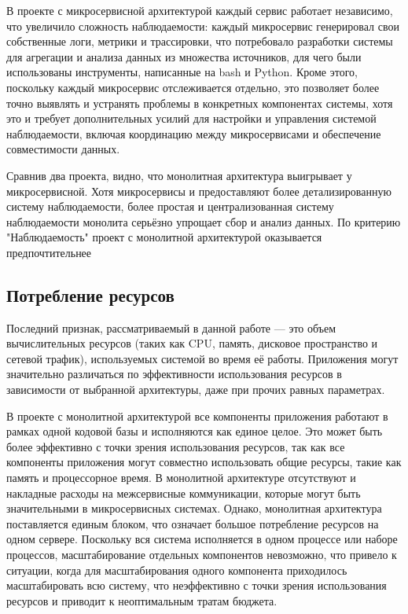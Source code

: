    В проекте с микросервисной архитектурой каждый сервис работает независимо, что увеличило сложность наблюдаемости: каждый микросервис генерировал свои собственные логи, метрики и трассировки, что потребовало разработки системы для агрегации и анализа данных из множества источников, для чего были использованы инструменты, написанные на bash и Python. Кроме этого, поскольку каждый микросервис отслеживается отдельно, это позволяет более точно выявлять и устранять проблемы в конкретных компонентах системы, хотя это и требует дополнительных усилий для настройки и управления системой наблюдаемости, включая координацию между микросервисами и обеспечение совместимости данных.
    
    Сравнив два проекта, видно, что монолитная архитектура выигрывает у микросервисной. Хотя микросервисы и предоставляют более детализированную систему наблюдаемости, более простая и централизованная систему наблюдаемости монолита серьёзно упрощает сбор и анализ данных. По критерию "Наблюдаемость" проект с монолитной архитектурой оказывается предпочтительнее

\subsection{Потребление ресурсов}
    Последний признак, рассматриваемый в данной работе — это объем вычислительных ресурсов (таких как CPU, память, дисковое пространство и сетевой трафик), используемых системой во время её работы. Приложения могут значительно различаться по эффективности использования ресурсов в зависимости от выбранной архитектуры, даже при прочих равных параметрах.
    
    В проекте с монолитной архитектурой все компоненты приложения работают в рамках одной кодовой базы и исполняются как единое целое. Это может быть более эффективно с точки зрения использования ресурсов, так как все компоненты приложения могут совместно использовать общие ресурсы, такие как память и процессорное время. В монолитной архитектуре отсутствуют и накладные расходы на межсервисные коммуникации, которые могут быть значительными в микросервисных системах. Однако, монолитная архитектура поставляется единым блоком, что означает большое потребление ресурсов на одном сервере. Поскольку вся система исполняется в одном процессе или наборе процессов, масштабирование отдельных компонентов невозможно, что привело к ситуации, когда для масштабирования одного компонента приходилось масштабировать всю систему, что неэффективно с точки зрения использования ресурсов и приводит к неоптимальным тратам бюджета.
    

